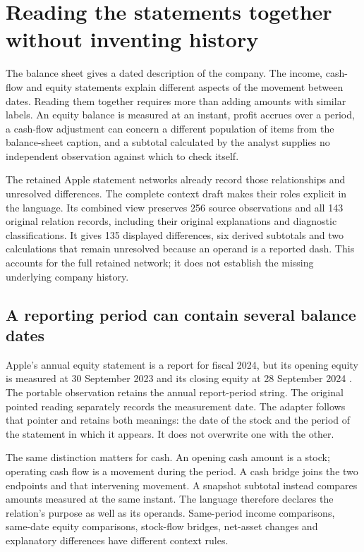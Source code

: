 \section{Reading the statements together without inventing history}
\label{sec:statement-context-relations}

The balance sheet gives a dated description of the company. The income,
cash-flow and equity statements explain different aspects of the movement
between dates. Reading them together requires more than adding amounts with
similar labels. An equity balance is measured at an instant, profit accrues
over a period, a cash-flow adjustment can concern a different population of
items from the balance-sheet caption, and a subtotal calculated by the
analyst supplies no independent observation against which to check itself.

The retained Apple statement networks already record those relationships
and unresolved differences. The complete context draft makes their roles
explicit in the language. Its combined view preserves 256 source observations
and all 143 original relation records, including their original explanations
and diagnostic classifications. It gives 135 displayed differences, six
derived subtotals and two calculations that remain unresolved because an
operand is a reported dash. This accounts for the full retained network;
it does not establish the missing underlying company history.

\subsection{A reporting period can contain several balance dates}

Apple's annual equity statement is a report for fiscal 2024, but its opening
equity is measured at 30 September 2023 and its closing equity at
28 September 2024 \citep[p.~32]{apple2024}. The portable observation retains
the annual report-period string. The original pointed reading separately
records the measurement date. The adapter follows that pointer and retains
both meanings: the date of the stock and the period of the statement in
which it appears. It does not overwrite one with the other.

The same distinction matters for cash. An opening cash amount is a stock;
operating cash flow is a movement during the period. A cash bridge joins
the two endpoints and that intervening movement. A snapshot subtotal instead
compares amounts measured at the same instant. The language therefore
declares the relation's purpose as well as its operands. Same-period income
comparisons, same-date equity comparisons, stock-flow bridges, net-asset
changes and explanatory differences have different context rules.

